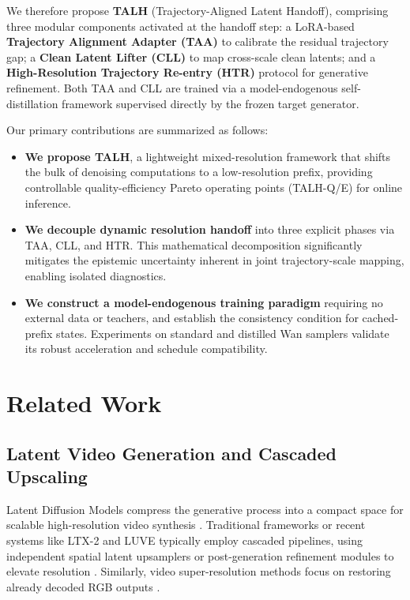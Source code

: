 We therefore propose \textbf{TALH} (Trajectory-Aligned Latent Handoff),
comprising three modular components activated at the handoff step: a LoRA-based
\textbf{Trajectory Alignment Adapter (TAA)} to calibrate the residual trajectory gap;
a \textbf{Clean Latent Lifter (CLL)} to map cross-scale clean latents; and a
\textbf{High-Resolution Trajectory Re-entry (HTR)} protocol for generative refinement.
Both TAA and CLL are trained via a model-endogenous self-distillation framework
supervised directly by the frozen target generator.

Our primary contributions are summarized as follows:
\begin{itemize}
\item \textbf{We propose TALH}, a lightweight mixed-resolution framework that shifts the bulk of denoising computations to a low-resolution prefix, providing controllable quality-efficiency Pareto operating points (TALH-Q/E) for online inference.
\item \textbf{We decouple dynamic resolution handoff} into three explicit phases via TAA, CLL, and HTR. This mathematical decomposition significantly mitigates the epistemic uncertainty inherent in joint trajectory-scale mapping, enabling isolated diagnostics.
\item \textbf{We construct a model-endogenous training paradigm} requiring no external data or teachers, and establish the consistency condition for cached-prefix states. Experiments on standard and distilled Wan samplers validate its robust acceleration and schedule compatibility.
\end{itemize}

\section{Related Work}

\subsection{Latent Video Generation and Cascaded Upscaling}
Latent Diffusion Models compress the generative process into a compact space for scalable high-resolution video synthesis \citep{rombach2022ldm}. Traditional frameworks or recent systems like LTX-2 and LUVE typically employ cascaded pipelines, using independent spatial latent upsamplers or post-generation refinement modules to elevate resolution \citep{blattmann2023videoldm, hacohen2026ltx2, zhao2026luve}. Similarly, video super-resolution methods focus on restoring already decoded RGB outputs \citep{zhou2024upscale, xu2024videogigagan}.

